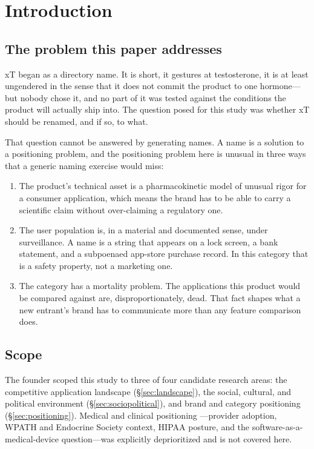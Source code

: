 \documentclass[11pt,a4paper]{article}
\begin{document}
\tableofcontents
\clearpage

\section{Introduction}
\label{sec:intro}

\subsection{The problem this paper addresses}

xT began as a directory name. It is short, it gestures at testosterone,
it is at least ungendered in the sense that it does not commit the
product to one hormone---but nobody chose it, and no part of it was
tested against the conditions the product will actually ship into. The
question posed for this study was whether xT should be renamed, and if
so, to what.

That question cannot be answered by generating names. A name is a
solution to a positioning problem, and the positioning problem here is
unusual in three ways that a generic naming exercise would miss:

\begin{enumerate}[leftmargin=1.5em,itemsep=0.3em]
\item The product's technical asset is a pharmacokinetic model of
      unusual rigor for a consumer application, which means the brand
      has to be able to carry a scientific claim without over-claiming
      a regulatory one.
\item The user population is, in a material and documented sense, under
      surveillance. A name is a string that appears on a lock screen, a
      bank statement, and a subpoenaed app-store purchase record. In
      this category that is a safety property, not a marketing one.
\item The category has a mortality problem. The applications this
      product would be compared against are, disproportionately,
      dead. That fact shapes what a new entrant's brand has to
      communicate more than any feature comparison does.
\end{enumerate}

\subsection{Scope}

The founder scoped this study to three of four candidate research
areas: the competitive application landscape
(\S\ref{sec:landscape}), the social, cultural, and political
environment (\S\ref{sec:sociopolitical}), and brand and category
positioning (\S\ref{sec:positioning}). Medical and clinical positioning
---provider adoption, WPATH and Endocrine Society context, HIPAA
posture, and the software-as-a-medical-device question---was explicitly
deprioritized and is not covered here.
\end{document}
